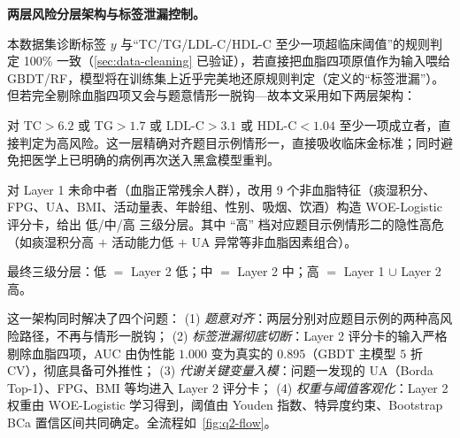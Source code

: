 \documentclass{MathorCupmodeling}
\providecommand{\tightlist}{%
  \setlength{\itemsep}{0pt}\setlength{\parskip}{0pt}}
\begin{document}
\noindent\textbf{两层风险分层架构与标签泄漏控制。}

本数据集诊断标签 $y$ 与``TC/TG/LDL-C/HDL-C 至少一项超临床阈值''的规则判定 100\% 一致（\cref{sec:data-cleaning} 已验证），若直接把血脂四项原值作为输入喂给 GBDT/RF，模型将在训练集上近乎完美地还原规则判定（\cite{kaufman2012leakage}定义的``标签泄漏''）。但若完全剔除血脂四项又会与题意情形一脱钩---故本文采用如下两层架构：

\begin{description}
\tightlist
\item[Layer 1 硬规则层] 对 $\text{TC}>6.2$ 或 $\text{TG}>1.7$ 或 $\text{LDL-C}>3.1$ 或 $\text{HDL-C}<1.04$ 至少一项成立者，直接判定为高风险。这一层精确对齐题目示例情形一，直接吸收临床金标准；同时避免把医学上已明确的病例再次送入黑盒模型重判。
\item[Layer 2 评分卡层] 对 Layer 1 未命中者（血脂正常残余人群），改用 9 个非血脂特征（痰湿积分、FPG、UA、BMI、活动量表、年龄组、性别、吸烟、饮酒）构造 WOE-Logistic 评分卡，给出 低/中/高 三级分层。其中 ``高'' 档对应题目示例情形二的隐性高危（如痰湿积分高 $+$ 活动能力低 $+$ UA 异常等非血脂因素组合）。
\item[融合输出] 最终三级分层：低 $=$ Layer 2 低；中 $=$ Layer 2 中；高 $=$ Layer 1 $\cup$ Layer 2 高。
\end{description}

这一架构同时解决了四个问题：
(1) \emph{题意对齐}：两层分别对应题目示例的两种高风险路径，不再与情形一脱钩；
(2) \emph{标签泄漏彻底切断}：Layer 2 评分卡的输入严格剔除血脂四项，AUC 由伪性能 $1.000$ 变为真实的 $0.895$（GBDT 主模型 $5$ 折 CV），彻底具备可外推性；
(3) \emph{代谢关键变量入模}：问题一发现的 UA（Borda Top-1）、FPG、BMI 等均进入 Layer 2 评分卡；
(4) \emph{权重与阈值客观化}：Layer 2 权重由 WOE-Logistic 学习得到，阈值由 Youden 指数、特异度约束、Bootstrap BCa 置信区间共同确定。全流程如~\cref{fig:q2-flow}。
\end{document}
